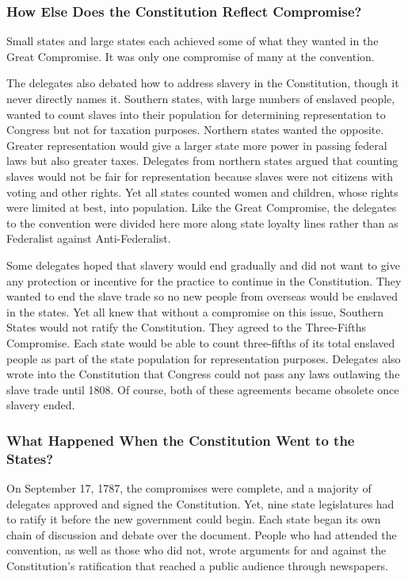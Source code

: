\subsubsection*{How Else Does the Constitution Reflect Compromise?}

Small states and large states each achieved some of what they wanted in the
Great Compromise. It was only one compromise of many at the convention.

The delegates also debated how to address slavery in the Constitution, though it
never directly names it. Southern states, with large numbers of enslaved people,
wanted to count slaves into their population for determining representation to
Congress but not for taxation purposes. Northern states wanted the opposite.
Greater representation would give a larger state more power in passing federal
laws but also greater taxes. Delegates from northern states argued that counting
slaves would not be fair for representation because slaves were not citizens
with voting and other rights. Yet all states counted women and children, whose
rights were limited at best, into population. Like the Great Compromise, the
delegates to the convention were divided here more along state loyalty lines
rather than as Federalist against Anti-Federalist.

Some delegates hoped that slavery would end gradually and did not want to give
any protection or incentive for the practice to continue in the Constitution.
They wanted to end the slave trade so no new people from overseas would be
enslaved in the states. Yet all knew that without a compromise on this issue,
Southern States would not ratify the Constitution. They agreed to the
Three-Fifths Compromise. Each state would be able to count three-fifths of its
total enslaved people as part of the state population for representation
purposes. Delegates also wrote into the Constitution that Congress could not
pass any laws outlawing the slave trade until 1808. Of course, both of these
agreements became obsolete once slavery ended.

\subsubsection*{What Happened When the Constitution Went to the States?}

On September 17, 1787, the compromises were complete, and a majority of
delegates approved and signed the Constitution. Yet, nine state legislatures had
to ratify it before the new government could begin. Each state began its own
chain of discussion and debate over the document. People who had attended the
convention, as well as those who did not, wrote arguments for and against the
Constitution’s ratification that reached a public audience through newspapers.

